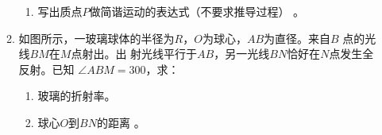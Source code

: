\begin{enumerate}
\begin{enumerate}
\begin{enumerate}
\item 
写出质点$ P $做简谐运动的表达式（不要求推导过程） 。

	
\end{enumerate}
\begin{figure}[h!]
	\flushright
	
\end{figure}





\item 
如图所示，一玻璃球体的半径为$ R $，$ O $为球心，$ AB $为直径。来自$ B $ 点的光线$ BM $在$ M $点射出。出
射光线平行于$ AB $，另一光线$ BN $恰好在$ N $点发生全反射。已知
$ \angle ABM=300 $，求：
\begin{enumerate}
	\item
玻璃的折射率。

\item 
球心$ O $到$ BN $的距离 。
\end{enumerate}
\begin{figure}[h!]
	\flushright
	
\end{figure}






\end{enumerate}
\end{enumerate}
